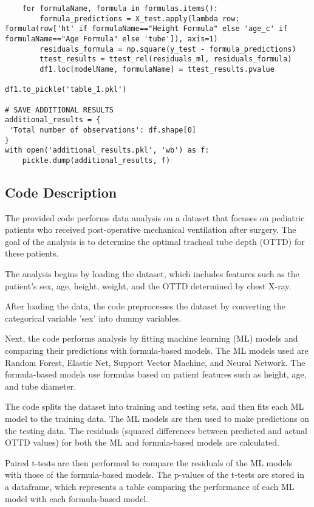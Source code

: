 \documentclass[11pt]{article}
\begin{document}
\begin{verbatim}
    for formulaName, formula in formulas.items():
        formula_predictions = X_test.apply(lambda row: formula(row['ht' if formulaName=="Height Formula" else 'age_c' if formulaName=="Age Formula" else 'tube']), axis=1)
        residuals_formula = np.square(y_test - formula_predictions)
        ttest_results = ttest_rel(residuals_ml, residuals_formula)
        df1.loc[modelName, formulaName] = ttest_results.pvalue
        
df1.to_pickle('table_1.pkl')

# SAVE ADDITIONAL RESULTS
additional_results = {
 'Total number of observations': df.shape[0]
}
with open('additional_results.pkl', 'wb') as f:
    pickle.dump(additional_results, f)

\end{verbatim}

\subsection{Code Description}

The provided code performs data analysis on a dataset that focuses on pediatric patients who received post-operative mechanical ventilation after surgery. The goal of the analysis is to determine the optimal tracheal tube depth (OTTD) for these patients.

The analysis begins by loading the dataset, which includes features such as the patient's sex, age, height, weight, and the OTTD determined by chest X-ray. 

After loading the data, the code preprocesses the dataset by converting the categorical variable 'sex' into dummy variables.

Next, the code performs analysis by fitting machine learning (ML) models and comparing their predictions with formula-based models. The ML models used are Random Forest, Elastic Net, Support Vector Machine, and Neural Network. The formula-based models use formulas based on patient features such as height, age, and tube diameter.

The code splits the dataset into training and testing sets, and then fits each ML model to the training data. The ML models are then used to make predictions on the testing data. The residuals (squared differences between predicted and actual OTTD values) for both the ML and formula-based models are calculated.

Paired t-tests are then performed to compare the residuals of the ML models with those of the formula-based models. The p-values of the t-tests are stored in a dataframe, which represents a table comparing the performance of each ML model with each formula-based model.
\end{document}
